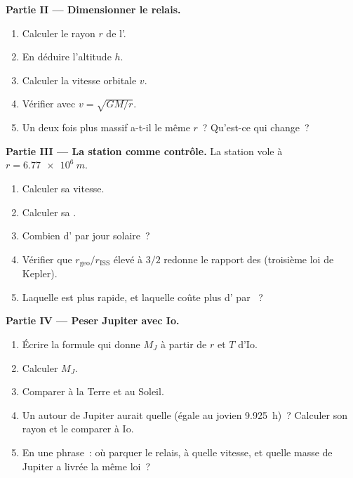 \begin{problem}
\medskip
\noindent\textbf{Partie II --- Dimensionner le relais.}
\begin{enumerate}[resume]
  \item Calculer le rayon $r$ de l'.
  \item En déduire l'altitude $h$.
  \item Calculer la vitesse orbitale $v$.
  \item Vérifier avec $v = \sqrt{GM/r}$.
  \item Un  deux fois plus massif a-t-il le
        même $r$~? Qu'est-ce qui change~?
\end{enumerate}

\medskip
\noindent\textbf{Partie III --- La station comme contrôle.}
La station vole à $r = \qty{6.77e6}{m}$.
\begin{enumerate}[resume]
  \item Calculer sa vitesse.
  \item Calculer sa .
  \item Combien d' par jour solaire~?
  \item Vérifier que $r_{\text{geo}}/r_{\text{ISS}}$ élevé à $3/2$
        redonne le rapport des  (troisième loi de Kepler).
  \item Laquelle est plus rapide, et laquelle coûte plus d'
        par ~?
\end{enumerate}

\medskip
\noindent\textbf{Partie IV --- Peser Jupiter avec Io.}
\begin{enumerate}[resume]
  \item Écrire la formule qui donne $M_J$ à partir de $r$ et $T$ d'Io.
  \item Calculer $M_J$.
  \item Comparer à la Terre et au Soleil.
  \item Un   autour de Jupiter
        aurait quelle  (égale au  jovien
        \qty{9.925}{h})~? Calculer son rayon et le comparer à Io.
  \item En une phrase~: où parquer le relais, à quelle vitesse, et
        quelle masse de Jupiter a livrée la même loi~?
\end{enumerate}
\end{problem}
